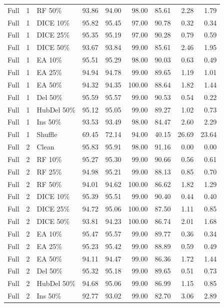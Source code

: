 {\begin{longtable}{rllrrrrrr}
Full & 1 & RF 50\% & 93.86 & 94.00 & 98.00 & 85.61 & 2.28 & 1.79 \\
Full & 1 & DICE 10\% & 95.82 & 95.45 & 97.00 & 90.78 & 0.32 & 0.34 \\
Full & 1 & DICE 25\% & 95.35 & 95.19 & 97.00 & 90.28 & 0.79 & 0.59 \\
Full & 1 & DICE 50\% & 93.67 & 93.84 & 99.00 & 85.61 & 2.46 & 1.95 \\
Full & 1 & EA 10\% & 95.51 & 95.29 & 98.00 & 90.03 & 0.63 & 0.49 \\
Full & 1 & EA 25\% & 94.94 & 94.78 & 99.00 & 89.65 & 1.19 & 1.01 \\
Full & 1 & EA 50\% & 94.32 & 94.35 & 100.00 & 88.64 & 1.82 & 1.44 \\
Full & 1 & Del 50\% & 95.59 & 95.57 & 99.00 & 90.53 & 0.54 & 0.22 \\
Full & 1 & HubDel 50\% & 95.12 & 95.05 & 99.00 & 89.27 & 1.02 & 0.73 \\
Full & 1 & Ins 50\% & 93.53 & 93.49 & 98.00 & 84.47 & 2.60 & 2.29 \\
Full & 1 & Shuffle & 69.45 & 72.14 & 94.00 & 40.15 & 26.69 & 23.64 \\
Full & 2 & Clean & 95.83 & 95.91 & 98.00 & 91.16 & 0.00 & 0.00 \\
Full & 2 & RF 10\% & 95.27 & 95.30 & 99.00 & 90.66 & 0.56 & 0.61 \\
Full & 2 & RF 25\% & 94.98 & 95.21 & 99.00 & 88.13 & 0.85 & 0.70 \\
Full & 2 & RF 50\% & 94.01 & 94.62 & 100.00 & 86.62 & 1.82 & 1.29 \\
Full & 2 & DICE 10\% & 95.39 & 95.51 & 99.00 & 90.40 & 0.44 & 0.40 \\
Full & 2 & DICE 25\% & 94.72 & 95.06 & 100.00 & 87.50 & 1.11 & 0.85 \\
Full & 2 & DICE 50\% & 93.81 & 94.23 & 100.00 & 86.74 & 2.01 & 1.68 \\
Full & 2 & EA 10\% & 95.47 & 95.57 & 99.00 & 89.77 & 0.36 & 0.34 \\
Full & 2 & EA 25\% & 95.23 & 95.42 & 99.00 & 88.89 & 0.59 & 0.49 \\
Full & 2 & EA 50\% & 94.11 & 94.47 & 99.00 & 86.36 & 1.72 & 1.44 \\
Full & 2 & Del 50\% & 95.32 & 95.18 & 99.00 & 89.65 & 0.51 & 0.73 \\
Full & 2 & HubDel 50\% & 94.68 & 95.06 & 99.00 & 86.99 & 1.15 & 0.85 \\
Full & 2 & Ins 50\% & 92.77 & 93.02 & 99.00 & 82.70 & 3.06 & 2.89 \\

\end{longtable}}
